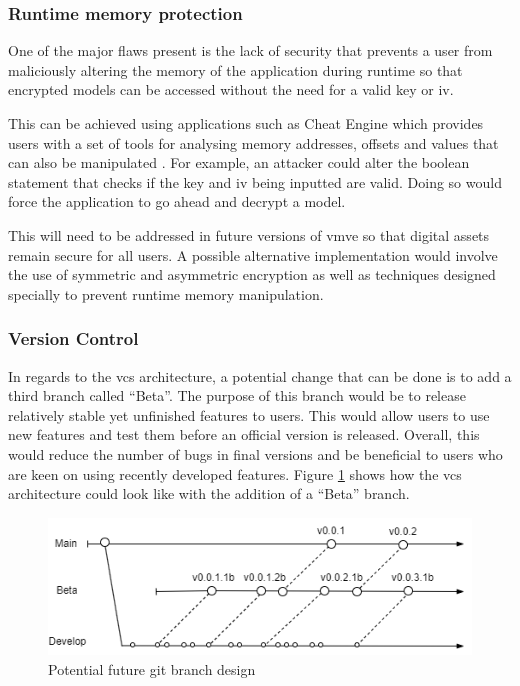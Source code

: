 \documentclass[11pt]{article}
\begin{document}
\subsubsection{Runtime memory protection}
One of the major flaws present is the lack of security that prevents a user from
maliciously altering the memory of the application during runtime so that
encrypted models can be accessed without the need for a valid key or iv.

This can be achieved using applications such as Cheat Engine which provides
users with a set of tools for analysing memory addresses, offsets and values
that can also be manipulated \cite{cheat_engine}. For example, an attacker could
alter the boolean statement that checks if the key and iv being inputted are
valid. Doing so would force the application to go ahead and decrypt a model.

This will need to be addressed in future versions of \gls*{vmve} so that digital
assets remain secure for all users. A possible alternative implementation would
involve the use of symmetric and asymmetric encryption as well as techniques
designed specially to prevent runtime memory manipulation.

\subsubsection{Version Control}
In regards to the \gls*{vcs} architecture, a potential change that can be done is
to add a third branch called ``Beta''. The purpose of this branch would be to
release relatively stable yet unfinished features to users. This would allow
users to use new features and test them before an official version is released.
Overall, this would reduce the number of bugs in final versions and be
beneficial to users who are keen on using recently developed features. Figure
\ref{fig:futurebrancharch} shows how the \gls*{vcs} architecture could look like
with the addition of a ``Beta'' branch.

\begin{figure}[H]
  \centering
  \includegraphics[width=\textwidth]{images/future_branch_design.png}
  \caption{Potential future git branch design}
  \label{fig:futurebrancharch}
\end{figure}
\end{document}
